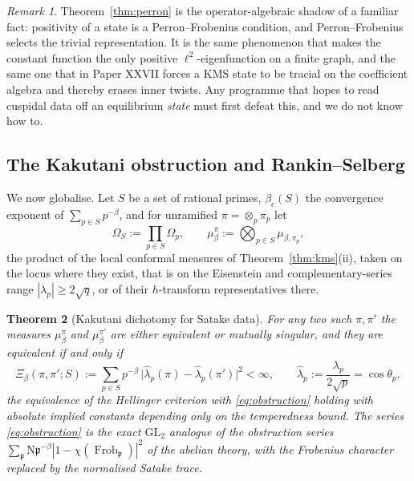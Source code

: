 \documentclass[11pt]{amsart}
\numberwithin{equation}{section}
\newtheorem{theorem}{Theorem}[section]
\theoremstyle{definition}
\theoremstyle{remark}
\newtheorem{remark}[theorem]{Remark}
\newcommand{\pp}{\mathfrak{p}}
\newcommand{\Ns}{\mathrm{N}}
\newcommand{\Frob}{\operatorname{Frob}}
\newcommand{\KMS}{\mathrm{KMS}}
\newcommand{\GL}{\mathrm{GL}}
\begin{document}
\begin{remark}
Theorem~\ref{thm:perron} is the operator-algebraic shadow of a familiar fact: positivity
of a state is a Perron--Frobenius condition, and Perron--Frobenius selects the trivial
representation. It is the same phenomenon that makes the constant function the only
positive $\ell^2$-eigenfunction on a finite graph, and the same one that in Paper XXVII
forces a $\KMS$ state to be tracial on the coefficient algebra and thereby erases inner
twists. Any programme that hopes to read cuspidal data off an equilibrium \emph{state}
must first defeat this, and we do not know how to.
\end{remark}

\subsection{The Kakutani obstruction and Rankin--Selberg}

We now globalise. Let $S$ be a set of rational primes, $\beta_c(S)$ the convergence
exponent of $\sum_{p\in S}p^{-\beta}$, and for unramified $\pi=\otimes_p\pi_p$ let
\[
\Omega_S:=\prod_{p\in S}\Omega_p,\qquad
\mu^\pi_\beta:=\bigotimes_{p\in S}\mu_{\beta,\pi_p},
\]
the product of the local conformal measures of Theorem~\ref{thm:kms}(ii), taken on the
locus where they exist, that is on the Eisenstein and complementary-series range
$|\lambda_p|\ge2\sqrt q$, or of their $h$-transform representatives there.

\begin{theorem}[Kakutani dichotomy for Satake data]\label{thm:kakutani}
For any two such $\pi,\pi'$ the measures $\mu^\pi_\beta$ and $\mu^{\pi'}_\beta$ are
either equivalent or mutually singular, and they are equivalent if and only if
\begin{equation}\label{eq:obstruction}
\Xi_\beta(\pi,\pi';S):=\sum_{p\in S}p^{-\beta}\,
\bigl|\widehat\lambda_p(\pi)-\widehat\lambda_p(\pi')\bigr|^2<\infty,
\qquad
\widehat\lambda_p:=\frac{\lambda_p}{2\sqrt p}=\cos\theta_p ,
\end{equation}
the equivalence of the Hellinger criterion with \eqref{eq:obstruction} holding with
absolute implied constants depending only on the temperedness bound. The series
\eqref{eq:obstruction} is the exact $\GL_2$ analogue of the obstruction series
$\sum_\pp\Ns\pp^{-\beta}|1-\chi(\Frob_\pp)|^2$ of the abelian theory, with the Frobenius
character replaced by the normalised Satake trace.
\end{theorem}
\end{document}
